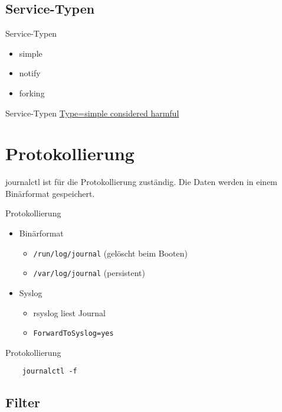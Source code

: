 \subsection{Service-Typen}

\begin{frame}{Service-Typen}
\begin{itemize}
\item simple
\item notify
\item forking
\end{itemize}
\end{frame}

\begin{frame}{Service-Typen}
\href{https://www.lucas-nussbaum.net/blog/?p=877}{Type=simple considered harmful}
\end{frame}

\section{Protokollierung}

journalctl ist für die Protokollierung zuständig. Die Daten werden in einem Binärformat gespeichert.

\begin{frame}[fragile]{Protokollierung}
\begin{itemize}
\item Binärformat
\begin{itemize}
\item \verb|/run/log/journal| (gelöscht beim Booten)
\item \verb|/var/log/journal| (persistent)
\end{itemize}
\item Syslog
	\begin{itemize}
	\item rsyslog liest Journal
	\item \verb|ForwardToSyslog=yes|
	\end{itemize}
\end{itemize}
\end{frame}

\begin{frame}[fragile]{Protokollierung}
  \begin{lstlisting}
    journalctl -f
    \end{lstlisting}
\end{frame}
  
\subsection{Filter}

